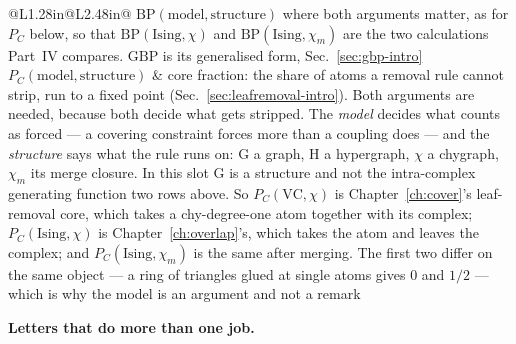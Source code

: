 \begin{longtable}{@{}L{1.28in}@{\hspace{0.8em}}L{2.48in}@{}}
                    $\mathrm{BP}(\text{model},\text{structure})$ where both
                    arguments matter, as for $P_{C}$ below, so that
                    $\mathrm{BP}(\mathrm{Ising},\chi)$ and
                    $\mathrm{BP}(\mathrm{Ising},\chi_{m})$ are the two
                    calculations Part~IV compares. $\mathrm{GBP}$ is its
                    generalised form, Sec.~\ref{sec:gbp-intro}\\[2pt]
$P_{C}(\text{model},\text{structure})$ & core fraction: the share of atoms a
                removal rule cannot strip, run to a fixed point
                (Sec.~\ref{sec:leafremoval-intro}). Both arguments are needed,
                because both decide what gets stripped. The \emph{model}
                decides what counts as forced --- a covering constraint forces
                more than a coupling does --- and the \emph{structure} says
                what the rule runs on: $\mathrm{G}$ a graph, $\mathrm{H}$ a
                hypergraph, $\chi$ a chygraph, $\chi_{m}$ its merge closure.
                In this slot $\mathrm{G}$ is a structure and not the
                intra-complex generating function two rows above. So
                $P_{C}(\mathrm{VC},\chi)$ is
                Chapter~\ref{ch:cover}'s leaf-removal core, which takes a
                chy-degree-one atom together with its complex;
                $P_{C}(\mathrm{Ising},\chi)$ is
                Chapter~\ref{ch:overlap}'s, which takes the atom and leaves the
                complex; and $P_{C}(\mathrm{Ising},\chi_{m})$ is
                the same after merging. The first two differ on the same object
                --- a ring of triangles glued at single atoms gives $0$ and
                $1/2$ --- which is why the model is an argument and not a
                remark\\
\end{longtable}

\medskip
\noindent\textbf{Letters that do more than one job.}

